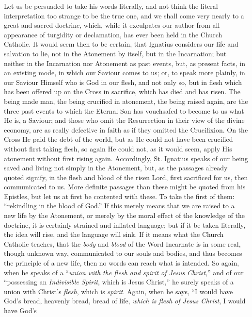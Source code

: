 Let us be persuaded to take his words literally,
and not think the literal interpretation too strange to be the true
one, and we shall come very nearly to a great and sacred doctrine,
which, while it exculpates our author from all appearance of turgidity
or declamation, has ever been held in the Church Catholic. It would
seem then to be certain, that Ignatius considers our life and
salvation to lie, not in the Atonement by itself, but in the
Incarnation; but neither in the Incarnation nor Atonement as past
events, but, as present facts, in an existing mode, in which our
Saviour comes to us; or, to speak more plainly, in our Saviour Himself
who is God in our flesh, and not only so, but in flesh which has been
offered up on the Cross in sacrifice, which has died and has risen.
The being made man, the being crucified in atonement, the being raised
again, are the three past events to which the Eternal Son has
vouchsafed to become to us what He is, a Saviour; and those who omit
the Resurrection in their view of the divine economy, are as really
defective in faith as if they omitted the Crucifixion. On the Cross He
paid the debt of the world, but as He could not have been crucified
without first taking flesh, so again He could not, as it would seem,
apply His atonement without first rising again. Accordingly, St.
Ignatius speaks of our being saved and living not simply in the
Atonement, but, as the passages already quoted signify, in the flesh and blood of the risen Lord, first sacrificed for us, then
communicated to us. More definite passages than these might be quoted
from his Epistles, but let us at first be contented with these. To
take the first of them: ``rekindling in the blood of God.'' If this
merely means that we are raised to a new life by the Atonement, or
merely by the moral effect of the knowledge of the doctrine, it is
certainly strained and inflated language; but if it be taken
literally, the idea will rise, and the language will sink. If it means
what the Church Catholic teaches, that the \emph{body} and \emph{blood} of
the Word Incarnate is in some real, though unknown way, communicated
to our souls and bodies, and thus becomes the principle of a new life,
then no words can reach what is intended. So again, when he speaks of
a ``\emph{union with the flesh and spirit of Jesus Christ},'' and of our
``possessing an \emph{Indivisible Spirit}, which is Jesus Christ,'' he
surely speaks of a union with Christ's \emph{flesh}, which is \emph{spirit}.
Again, when he says, ``I would have God's bread, heavenly bread, bread
of life, \emph{which is flesh of Jesus Christ}, I would have God's
